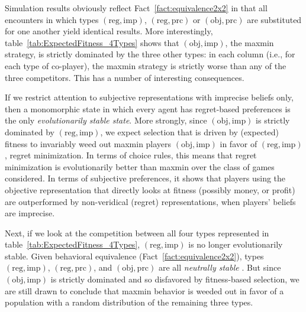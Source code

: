 \documentclass[fleqn,reqno,12pt]{article}
\theoremstyle{Satz}
\theoremstyle{Bsp}
\begin{document}
Simulation results obviously reflect Fact~\ref{fact:equivalence2x2} in that all encounters in
which types $(\text{reg}, \text{imp})$, $(\text{reg}, \text{prc})$ or
$(\text{obj}, \text{prc})$ are substituted for one another yield identical results. More
interestingly, table~\ref{tab:ExpectedFitness_4Types} shows that $(\text{obj}, \text{imp})$,
the maxmin strategy, is strictly dominated by the three other types: in each column (i.e.,
for each type of co-player), the maxmin strategy is strictly worse than any of the three
competitors. This has a number of interesting consequences.

If we restrict attention to subjective representations with imprecise beliefs only, then a monomorphic state in which every agent has
regret-based preferences is the only \emph{evolutionarily stable state}. More strongly, since
$(\text{obj}, \text{imp})$ is strictly dominated by $(\text{reg}, \text{imp})$, we expect
selection that is driven by (expected) fitness to invariably weed out maxmin players $(\text{obj}, \text{imp})$ in favor of $(\text{reg}, \text{imp})$, regret minimization. 
In terms of choice rules, this means that regret
minimization is evolutionarily better than maxmin over the class of games considered. In terms of subjective preferences, it shows that players using the objective representation that directly looks at fitness (possibly money, or profit) are outperformed by non-veridical (regret) representations, when players' beliefs are imprecise.

Next, if we look at the competition between all four types represented in
table~\ref{tab:ExpectedFitness_4Types}, $(\text{reg}, \text{imp})$ is no longer evolutionarily
stable. Given behavioral equivalence (Fact~\ref{fact:equivalence2x2}), types
$(\text{reg}, \text{imp})$, $(\text{reg}, \text{prc})$, and $(\text{obj}, \text{prc})$ are all
\emph{neutrally stable} \citep{Maynard-Smith1982:Evolution-and-t}. But since
$(\text{obj}, \text{imp})$ is strictly dominated and so disfavored by fitness-based selection,
we are still drawn to conclude that maxmin behavior is weeded out in favor of a population with
a random distribution of the remaining three types.
\end{document}
